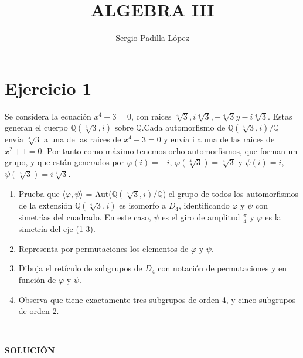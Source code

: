 \documentclass[a4paper]{article}
\title{ALGEBRA III}
\author{Sergio Padilla López}
\begin{document}
\maketitle

\section{Ejercicio 1}

Se considera la ecuación $x^{4}-3=0$, con raices $\sqrt[4]{3}, i\sqrt[4]{3}, -\sqrt[4]{3} y -i\sqrt[4]{3}$. Estas generan el cuerpo $\mathds{Q}(\sqrt[4]{3},i) $ sobre $\mathds{Q}$.Cada automorfismo de $\mathds{Q}(\sqrt[4]{3},i)/\mathds{Q}$ envia $\sqrt[4]{3}$ a una de las raices de $x^{4}-3=0$ y envía i a una de las raices de $x^{2}+1=0$. Por tanto como máximo tenemos ocho automorfismos, que forman un grupo, y que están generados por $\varphi(i)=-i $, $\varphi(\sqrt[4]{3})=\sqrt[4]{3}$ y $\psi(i)=i $, $\psi(\sqrt[4]{3})=i\sqrt[4]{3}$.

\begin{enumerate}
\item Prueba que $\langle\varphi,\psi\rangle$ = Aut($\mathds{Q}(\sqrt[4]{3},i)/\mathds{Q}$) el grupo de todos los automorfismos de la extensión $\mathds{Q}(\sqrt[4]{3},i)$ es isomorfo a $D_{4}$, identificando $\varphi$ y $\psi$ con simetrías del cuadrado. En este caso, $\psi$ es el giro de amplitud $\frac{\pi}{4}$ y $\varphi$ es la simetría del eje (1-3).

\item Representa por permutaciones los elementos de $\varphi$ y $\psi$.

\item Dibuja el retículo de subgrupos de $D_{4}$ con notación de permutaciones y en función de $\varphi$ y $\psi$.

\item Observa que tiene exactamente tres subgrupos de orden 4, y cinco subgrupos de orden 2.
\end{enumerate}
\

\textbf{SOLUCIÓN}
\end{document}
